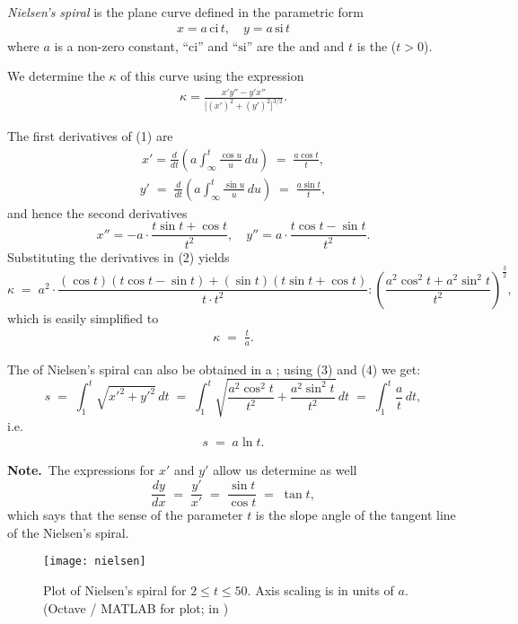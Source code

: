 \documentclass[12pt]{article}
\theoremstyle{definition}
\begin{document}
{\em Nielsen's spiral} is the plane curve defined in the 
parametric form
\begin{align}
x = a\,\mbox{ci}\,{t}, \quad y = a\,\mbox{si}\,{t} 
\end{align}
where $a$ is a non-zero constant, ``$\mbox{ci}$'' and 
``$\mbox{si}$'' are the  
and  
and $t$ is the  ($t > 0$).

We determine the  $\kappa$ of this curve using the expression
\begin{align}
\kappa = \frac{x'y''-y'x''}{{[}(x')^2+(y')^2{]}^{3/2}}.
\end{align}

The first derivatives of (1) are
\begin{align}
x' = \frac{d}{dt}\left(a\int_\infty^t\frac{\cos{u}}{u}\,du\!\right) 
\;=\; \frac{a\cos{t}}{t},
\end{align}
\begin{align}
y' \;=\; \frac{d}{dt}\left(a\int_\infty^t\frac{\sin{u}}{u}\,du\!\right) 
\;=\; \frac{a\sin{t}}{t},
\end{align}
and hence the second derivatives
$$x'' = -a\cdot\frac{t\sin{t}+\cos{t}}{t^2}, \quad y'' = a\cdot\frac{t\cos{t}-\sin{t}}{t^2}.$$
Substituting the derivatives in (2) yields
$$\kappa \;=\; 
a^2\!\cdot\!\frac{(\cos{t})(t\cos{t}-\sin{t})+(\sin{t})(t\sin{t}+\cos{t})}{t\cdot t^2}
\!:\!\left(\frac{a^2\cos^2{t}+a^2\sin^2{t}}{t^2}\right)^{\frac{3}{2}}\!,$$
which is easily simplified to
\begin{align}
\kappa \;=\; \frac{t}{a}.
\end{align}


The  of Nielsen's spiral can also be obtained in a  ; using (3) and (4) we get:
$$s \;=\; \int_1^t\sqrt{x'^2\!+\!y'^2}\,dt \;=\; 
\int_1^t\sqrt{ \frac{a^2\cos^2t}{t^2}+\frac{a^2\sin^2t}{t^2} }\,dt \;=\; \int_1^t\frac{a}{t}\,dt,$$
i.e.
\begin{align}
s \;=\; a\ln{t}.
\end{align}


\textbf{Note.}\, The expressions for $x'$ and $y'$ allow us determine as well
$$\frac{dy}{dx} \;=\; \frac{y'}{x'} \;=\; \frac{\sin{t}}{\cos{t}} \;=\; \tan{t},$$
which says that the sense of the parameter $t$ is the slope angle of the tangent line of the Nielsen's spiral.

\begin{figure}
\begin{center}
\texttt{[image: nielsen]}
\caption{Plot of Nielsen's spiral for $2 \leq t \leq 50$.  
Axis scaling is in units of $a$. 
{\small 
(Octave / MATLAB  for plot;
in )}}
\end{center}
\end{figure}


\end{document}

